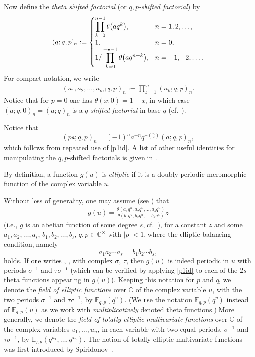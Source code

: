 \documentclass[10pt,a4paper]{amsart}
\numberwithin{equation}{section}
\theoremstyle{definition}
\newcommand{\ta}{\theta}
\newcommand{\C}{\mathbb C}
\newcommand{\E}{\mathbb E}
\begin{document}
Now define the {\em theta shifted factorial} (or
{\em $q,p$-shifted factorial}) by
\begin{gather*}
(a;q,p)_n := \begin{cases}
\displaystyle \prod^{n-1}_{k=0} \ta \bigl(aq^k\bigr),& n = 1, 2, \dots,\cr
1,& n = 0,\cr
\displaystyle 1/\prod^{-n-1}_{k=0} \ta \bigl(aq^{n+k}\bigr),& n = -1, -2, \dots.
\end{cases}
\end{gather*}
For compact notation, we write
\begin{gather*}
(a_1, a_2, \dots, a_m;q, p)_n := \prod^m_{k=1} (a_k;q,p)_n.
\end{gather*}
Notice that for $p=0$ one has $\ta (x;0) = 1-x$,
in which case $(a;q, 0)_n = (a;q)_n$
is a {\em $q$-shifted factorial} in base $q$ (cf.\ \cite{GR}).

Notice that
\[
(pa;q,p)_n=(-1)^na^{-n}q^{-\binom n2} (a;q,p)_n,
\]
which follows from repeated use of \eqref{p1id}.
A list of other useful identities for manipulating the
$q,p$-shifted factorials is given in \cite[Section~11.2]{GR}.

By definition, a function $g(u)$ is {\em elliptic} if it is
a doubly-periodic meromorphic function of the complex variable $u$.

Without loss of generality, one may assume
(see \cite[Theorem~1.3.3]{R21}) that
\begin{gather*}
g(u)=\frac{\ta(a_1q^u,a_2q^u,\dots,a_sq^u)}
{\ta(b_1q^u,b_2q^u,\dots,b_sq^u)} z
\end{gather*}
(i.e., $g$ is an abelian function of some degree $s$,
cf.\ \cite{Ba}),
for a constant $z$ and some
$a_1,a_2,\dots,a_s$, $b_1,b_2,\dots,b_s$, $q,p\in\C^\times$ with $|p|<1$,
where the elliptic balancing condition, namely
\[
a_1a_2\cdots a_s=b_1b_2\cdots b_s,\]
holds. If one writes , ,
with complex $\sigma$, $\tau$, then $g(u)$ is indeed periodic in $u$
with periods $\sigma^{-1}$ and $\tau\sigma^{-1}$
(which can be verified by applying \eqref{p1id} to each of the $2s$
theta functions appearing in $g(u)$).
Keeping this notation for $p$ and $q$, we denote the {\em field
of elliptic functions} over $\C$ of the complex variable $u$,
with the two periods $\sigma^{-1}$ and
$\tau\sigma^{-1}$, by $\E_{q,p}(q^u)$.
(We use the notation $\E_{q,p}(q^u)$ instead of
$\E_{q,p}(u)$ as we work with \textit{multiplicatively} denoted
theta functions.)
More generally, we denote the {\em field of totally elliptic multivariate
functions} over $\C$ of the complex variables $u_1,\dots,u_n$,
in each variable with two equal periods,
$\sigma^{-1}$ and $\tau\sigma^{-1}$, by
$\E_{q,p}(q^{u_1},\dots,q^{u_n})$.
The notion of totally elliptic multivariate functions
was first introduced by Spiridonov~\mbox{\cite{Sp02,Sp11}}.
\end{document}
